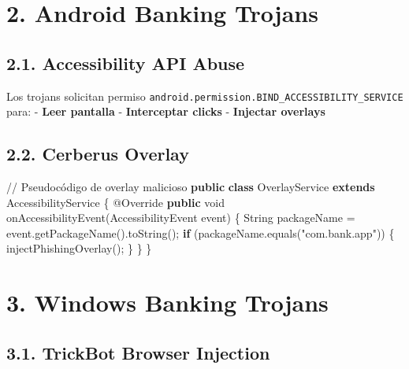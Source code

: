\documentclass[
  letterpaper,
]{report}
\newenvironment{Shaded}{\begin{snugshade}}{\end{snugshade}}
\newcommand{\AttributeTok}[1]{\textcolor[rgb]{0.40,0.45,0.13}{#1}}
\newcommand{\BuiltInTok}[1]{\textcolor[rgb]{0.00,0.23,0.31}{#1}}
\newcommand{\CommentTok}[1]{\textcolor[rgb]{0.37,0.37,0.37}{#1}}
\newcommand{\ControlFlowTok}[1]{\textcolor[rgb]{0.00,0.23,0.31}{\textbf{#1}}}
\newcommand{\DataTypeTok}[1]{\textcolor[rgb]{0.68,0.00,0.00}{#1}}
\newcommand{\FunctionTok}[1]{\textcolor[rgb]{0.28,0.35,0.67}{#1}}
\newcommand{\KeywordTok}[1]{\textcolor[rgb]{0.00,0.23,0.31}{\textbf{#1}}}
\newcommand{\NormalTok}[1]{\textcolor[rgb]{0.00,0.23,0.31}{#1}}
\newcommand{\OperatorTok}[1]{\textcolor[rgb]{0.37,0.37,0.37}{#1}}
\newcommand{\StringTok}[1]{\textcolor[rgb]{0.13,0.47,0.30}{#1}}
\begin{document}
\section{2. Android Banking Trojans}\label{android-banking-trojans}

\subsection{2.1. Accessibility API Abuse}\label{accessibility-api-abuse}

Los trojans solicitan permiso
\texttt{android.permission.BIND\_ACCESSIBILITY\_SERVICE} para: -
\textbf{Leer pantalla} - \textbf{Interceptar clicks} - \textbf{Injectar
overlays}

\subsection{2.2. Cerberus Overlay}\label{cerberus-overlay}

\begin{Shaded}
\begin{Highlighting}[]
\CommentTok{// Pseudocódigo de overlay malicioso}
\KeywordTok{public} \KeywordTok{class}\NormalTok{ OverlayService }\KeywordTok{extends}\NormalTok{ AccessibilityService }\OperatorTok{\{}
    \AttributeTok{@Override}
    \KeywordTok{public} \DataTypeTok{void} \FunctionTok{onAccessibilityEvent}\OperatorTok{(}\NormalTok{AccessibilityEvent event}\OperatorTok{)} \OperatorTok{\{}
        \BuiltInTok{String}\NormalTok{ packageName }\OperatorTok{=}\NormalTok{ event}\OperatorTok{.}\FunctionTok{getPackageName}\OperatorTok{().}\FunctionTok{toString}\OperatorTok{();}
        \ControlFlowTok{if} \OperatorTok{(}\NormalTok{packageName}\OperatorTok{.}\FunctionTok{equals}\OperatorTok{(}\StringTok{"com.bank.app"}\OperatorTok{))} \OperatorTok{\{}
            \FunctionTok{injectPhishingOverlay}\OperatorTok{();}
        \OperatorTok{\}}
    \OperatorTok{\}}
\OperatorTok{\}}
\end{Highlighting}
\end{Shaded}

\section{3. Windows Banking Trojans}\label{windows-banking-trojans}

\subsection{3.1. TrickBot Browser
Injection}\label{trickbot-browser-injection}
\end{document}
